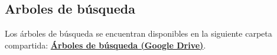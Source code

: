 
\subsection{Arboles de búsqueda}\label{sec:05-reunion-arboles}
Los árboles de búsqueda se encuentran disponibles en la siguiente carpeta compartida:
\href{https://drive.google.com/drive/folders/1C7ifyK-Nd0lVHEO3_xcWdNKiKoEAc8NW?usp=sharing}{\textbf{Árboles de búsqueda (Google Drive)}}.
